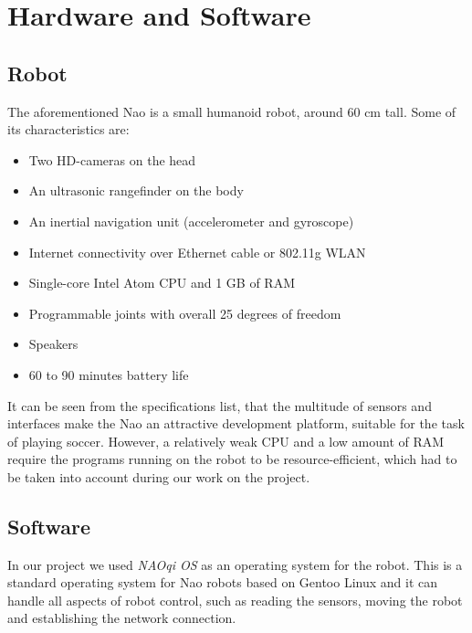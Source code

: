\chapter{Hardware and Software}

\section{Robot}

The aforementioned Nao \cite{nao} is a small humanoid robot, around 60
cm tall. Some of its characteristics are:

\begin{itemize}

\item Two HD-cameras on the head

\item An ultrasonic rangefinder on the body

\item An inertial navigation unit (accelerometer and gyroscope)

\item Internet connectivity over Ethernet cable or 802.11g WLAN

\item Single-core Intel Atom CPU and 1 GB of RAM

\item Programmable joints with overall 25 degrees of freedom

\item Speakers

\item 60 to 90 minutes battery life

\end{itemize}

It can be seen from the specifications list, that the multitude of sensors and
interfaces make the Nao an attractive development platform, suitable for the task
of playing soccer. However, a relatively weak CPU and a low amount of RAM require
the programs running on the robot to be resource-efficient, which had to be
taken into account during our work on the project.

\section{Software}

In our project we used \textit{NAOqi OS} as an operating system for the robot.
This is a standard operating system for Nao robots based on Gentoo Linux and
it can handle all aspects of robot control, such as reading the sensors, moving
the robot and establishing the network connection.

